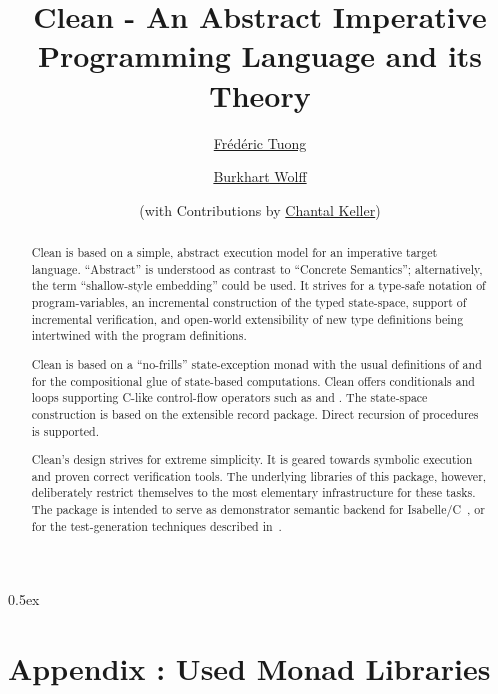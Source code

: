\documentclass[fontsize=11pt,paper=a4,open=right,twoside,abstract=true]{scrreprt}
\begin{document}
\title{Clean - An Abstract Imperative Programming Language and its Theory}
\author{%
  \href{https://www.lri.fr/~ftuong/}{Fr\'ed\'eric Tuong}
  \and
  \href{https://www.lri.fr/~wolff/}{Burkhart Wolff} \\
  \and
  (with Contributions by \href{https://www.lri.fr/~keller/}{Chantal Keller})}
\publishers{%
  \mbox{LRI, Univ. Paris-Sud, CNRS, Universit\'e Paris-Saclay} \\
  b\^at. 650 Ada Lovelace, 91405 Orsay, France \texorpdfstring{\\}{}
}

\maketitle

\begin{abstract}
Clean is based on a simple, abstract execution model for an imperative target language. ``Abstract''
is understood as contrast to ``Concrete Semantics''; alternatively, the term ``shallow-style
embedding'' could be used. It strives for a type-safe notation of program-variables, an incremental
construction of the typed state-space, support of incremental verification, and 
open-world extensibility of new type definitions being intertwined with the program
definitions.

Clean is based on a ``no-frills'' state-exception monad with the usual definitions of  and
 for the compositional glue of state-based computations. Clean offers conditionals and
loops supporting C-like control-flow operators such as  and . The state-space
construction is based on the extensible record package. Direct recursion of procedures is supported.

Clean's design strives for extreme simplicity. It is geared towards symbolic execution and proven
correct verification tools. The underlying libraries of this package, however, deliberately restrict
themselves to the most elementary infrastructure for these tasks. The package is intended to serve
as demonstrator semantic backend for Isabelle/C~\cite{TuongWolff19}, or for the test-generation
techniques described in~\cite{DBLP:conf/tap/Keller18}.
\end{abstract}

\newpage
\tableofcontents

\parindent 0pt\parskip 0.5ex

% 
\newpage





\newpage
\chapter{Appendix : Used Monad Libraries}













\end{document}
